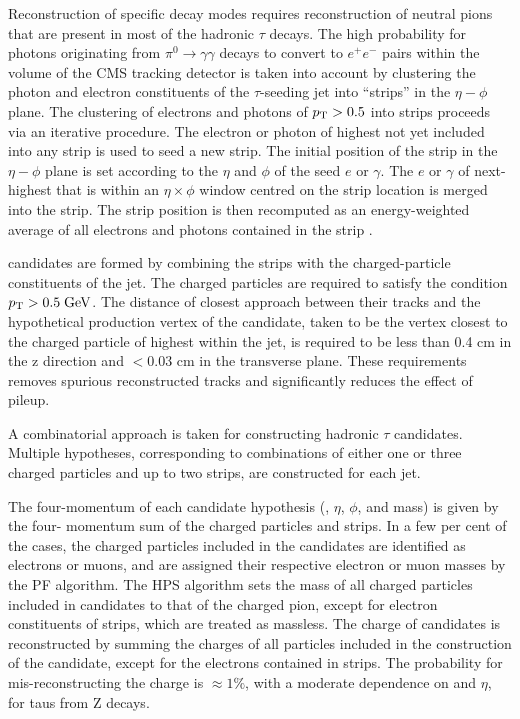 Reconstruction of specific \hadtau decay modes requires reconstruction of neutral pions that are present in most of the hadronic \ensuremath{\tau} decays. The high probability for photons originating from \ensuremath{\pi^{0} \longrightarrow \gamma \gamma} decays to convert to \ensuremath{e^{+}e^{-}} pairs within the volume of the CMS tracking detector is taken into account by clustering the photon and electron constituents of the \ensuremath{\tau}-seeding jet into “strips” in the \ensuremath{\eta - \phi} plane. The clustering of electrons and photons of \ensuremath{\pt > 0.5} \gev into strips proceeds via an iterative procedure. The electron or photon of highest \pt not yet included into any strip is used to seed a new strip. The initial position of the strip in the \ensuremath{\eta - \phi} plane is set according to the \ensuremath{\eta} and \ensuremath{\phi} of the seed \ensuremath{e} or \ensuremath{\gamma}. The \ensuremath{e} or \ensuremath{\gamma} of next-highest \pt that is within an \ensuremath{\eta \times \phi} window centred on the strip location is merged into the strip. The strip position is then recomputed as an energy-weighted average of all electrons and photons contained in the strip \cite{Khachatryan:2015dfa}.

\hadtau candidates are formed by combining the strips with the charged-particle constituents of the jet. The charged particles are required to satisfy the condition \ensuremath{\pt > 0.5 \gev}. The distance of closest approach between their tracks and the hypothetical production vertex of the \hadtau candidate, taken to be the vertex closest to the charged particle of highest \pt within the jet, is required to be less than 0.4 cm in the z direction and \ensuremath{< 0.03} cm in the transverse plane. These requirements removes spurious reconstructed tracks and significantly reduces the effect of pileup.

A combinatorial approach is taken for constructing hadronic \ensuremath{\tau} candidates. Multiple \hadtau hypotheses, corresponding to combinations of either one or three charged particles and up to two strips, are constructed for each jet.

The four-momentum of each \hadtau candidate hypothesis (\pt, \ensuremath{\eta}, \ensuremath{\phi}, and mass) is given by the four- momentum sum of the charged particles and strips. In a few per cent of the cases, the charged particles included in the \hadtau candidates are identified as electrons or muons, and are assigned their respective electron or muon masses by the PF algorithm. The HPS algorithm sets the mass of all charged particles included in \hadtau candidates to that of the charged pion, except for electron constituents of strips, which are treated as massless. The charge of \hadtau candidates is reconstructed by summing the charges of all particles included in the construction of the \hadtau candidate, except for the electrons contained in strips. The probability for mis-reconstructing the \hadtau charge is \ensuremath{\approx 1 \%}, with a moderate dependence on \pt and \ensuremath{\eta}, for taus from Z decays.

